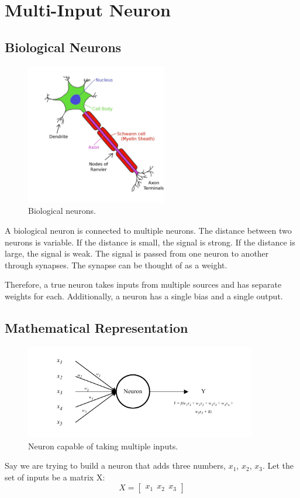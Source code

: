 \documentclass[12pt,a4paper]{article}
\begin{document}
\section{Multi-Input Neuron}
\subsection{Biological Neurons}
\begin{figure}[ht]
    \centering
    \includegraphics[width=0.55\textwidth]{../figs/Neuron_Diagram.jpg}
    \caption{Biological neurons.}
    \label{fig:biulogical_neurons}
\end{figure}
A biological neuron is connected to multiple neurons. The distance between two neurons is variable. If the distance is small, the signal is strong. If the distance is large, the signal is weak. The signal is passed from one neuron to another through synapses. The synapse can be thought of as a weight.

Therefore, a true neuron takes inputs from multiple sources and has separate weights for each. Additionally, a neuron has a single bias and a single output.
\subsection{Mathematical Representation}
\begin{figure}[ht]
    \centering
    \includegraphics[width=0.9\textwidth]{../figs/Multi_input_neuron.drawio.pdf}
    \caption{Neuron capable of taking multiple inputs.}
    \label{fig:multiple_input_neuron}
\end{figure}
Say we are trying to build a neuron that adds three numbers, $x_1$, $x_2$, $x_3$. 
Let the set of inputs be a matrix X:
\[
    X = \begin{bmatrix}
        x_1\ \   x_2\ \   x_3
    \end{bmatrix}
\]
\end{document}
